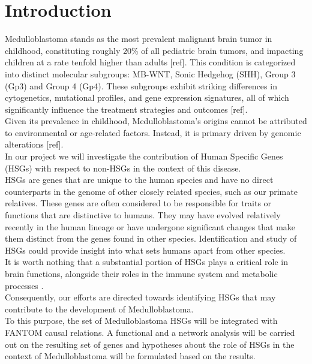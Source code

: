 \documentclass[10pt]{SelfArx} %
\affiliation{\textsuperscript{1}\textit{}} %
\affiliation{\textsuperscript{2}\textit{}} %
\affiliation{\textsuperscript{3}\textit{}} %
\affiliation{\textsuperscript{4}\textit{}} %
\affiliation{\textsuperscript{5}\textit{}} %
\begin{document}
\maketitle %



\section*{Introduction}\label{sec:introduction}
Medulloblastoma stands as the most prevalent malignant brain tumor in childhood, constituting roughly 20\% of all pediatric brain tumors, and impacting children at a rate tenfold higher than adults [ref]. This condition is categorized into distinct molecular subgroups: MB-WNT, Sonic Hedgehog (SHH), Group 3 (Gp3) and Group 4 (Gp4). These subgroups exhibit striking differences in cytogenetics, mutational profiles, and gene expression signatures, all of which significantly influence the treatment strategies and outcomes [ref]. \\
Given its prevalence in childhood, Medulloblastoma's origins cannot be attributed to environmental or age-related factors. Instead, it is primary driven by genomic alterations [ref]. \\
In our project we will investigate the contribution of Human Specific Genes (HSGs) with respect to non-HSGs in the context of this disease. \\
HSGs are genes that are unique to the human species and have no direct counterparts in the genome of other closely related species, such as our primate relatives. These genes are often considered to be responsible for traits or functions that are distinctive to humans. They may have evolved relatively recently in the human lineage or have undergone significant changes that make them distinct from the genes found in other species. Identification and study of HSGs could provide insight into what sets humans apart from other species. \\ 
It is worth nothing that a substantial portion of HSGs plays a critical role in brain functions, alongside their roles in the immune system and metabolic processes \cite{bitar2019genes}.\\
Consequently, our efforts are directed towards identifying HSGs that may contribute to the development of Medulloblastoma. \\
To this purpose, the set of Medulloblastoma HSGs will be integrated with FANTOM \cite{fantom5} causal relations. A functional and a network analysis will be carried out on the resulting set of genes and hypotheses about the role of HSGs in the context of Medulloblastoma will be formulated based on the results. \\
\end{document}
